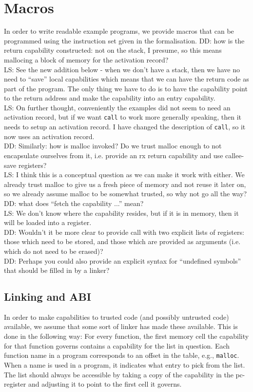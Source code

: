 \documentclass[a4paper]{article}
\newcommand\lau[1]{{\color{purple} \sf \footnotesize {LS: #1}}\\}
\newcommand\dominique[1]{{\color{purple} \sf \footnotesize {DD: #1}}\\}
\newcommand{\pcreg}{\mathrm{pc}}
\begin{document}
\section{Macros}
In order to write readable example programs, we provide macros that can be programmed using the instruction set given in the formalisation.
\dominique{how is the return capability constructed: not on the stack, I presume, so this means mallocing a block of memory for the activation record?}
\lau{See the new addition below - when we don't have a stack, then we have no need to ``save'' local capabilities which means that we can have the return code as part of the program. The only thing we have to do is to have the capability point to the return address and make the capability into an entry capability. }
\lau{On further thought, conveniently the examples did not seem to need an activation record, but if we want \texttt{call} to work more generally speaking, then it needs to setup an activation record. I have changed the description of \texttt{call}, so it now uses an activation record. }
\dominique{Similarly: how is malloc invoked?  Do we trust malloc enough to not encapsulate ourselves from it, i.e. provide an rx return capability and use callee-save registers?}
\lau{ I think this is a conceptual question as we can make it work with either. We already trust malloc to give us a fresh piece of memory and not reuse it later on, so we already assume malloc to be somewhat trusted, so why not go all the way? }
\dominique{what does ``fetch the capability ...'' mean?}
\lau{ We don't know where the capability resides, but if it is in memory, then it will be loaded into a register. }
\dominique{Wouldn't it be more clear to provide call with two explicit lists of registers: those which need to be stored, and those which are provided as arguments (i.e. which do not need to be erased)?}
\dominique{Perhaps you could also provide an explicit syntax for ``undefined symbols'' that should be filled in by a linker?}

\subsection{Linking and ABI}
In order to make capabilities to trusted code (and possibly untrusted code) available, we assume that some sort of linker has made these available. This is done in the following way: For every function, the first memory cell the capability for that function governs contains a capability for the list in question. Each function name in a program corresponds to an offset in the table, e.g., \texttt{malloc}. When a name is used in a program, it indicates what entry to pick from the list. The list should always be accessible by taking a copy of the capability in the $\pcreg$-register and adjusting it to point to the first cell it governs.
\end{document}
